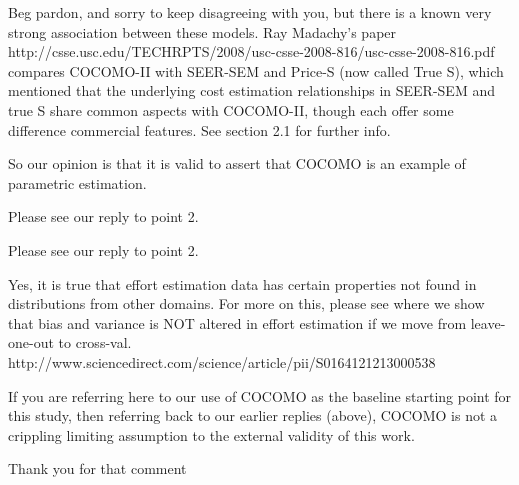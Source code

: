 Beg pardon, and sorry to keep disagreeing with you,
but     there is a known very 
strong association between these models.
Ray Madachy's paper http://csse.usc.edu/TECHRPTS/2008/usc-csse-2008-816/usc-csse-2008-816.pdf
compares COCOMO-II with SEER-SEM and Price-S (now called True S), which mentioned that the underlying cost estimation relationships in SEER-SEM and true S share  common aspects with COCOMO-II, though each offer some difference commercial features. See section 2.1 for further info.

So our opinion is that it is valid
to assert that COCOMO is an example of parametric estimation.



Please see our reply to point 2.



Please see our reply to point 2.


Yes, it is true that effort estimation data
has certain properties not found in distributions
from other domains. For more on this, please see
where we show that bias and variance is NOT altered
in effort estimation if we move from leave-one-out to cross-val. http://www.sciencedirect.com/science/article/pii/S0164121213000538


If you are referring here to our use of COCOMO as the baseline starting
point for this study, then referring back to our earlier replies
(above), COCOMO is not a crippling limiting assumption to the external
validity of this work.


Thank you for that comment

